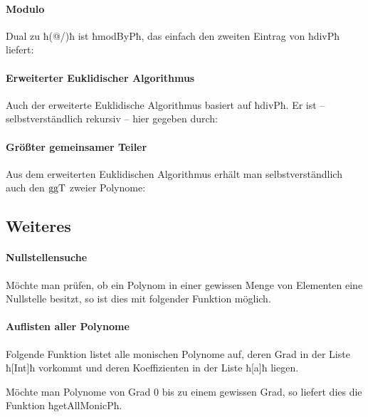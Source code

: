 

\paragraph{Modulo} Dual zu ħ(@/)ħ ist ħmodByPħ, das einfach den zweiten Eintrag
von ħdivPħ liefert:



\paragraph{Erweiterter Euklidischer Algorithmus} Auch der erweiterte
Euklidische Algorithmus basiert auf ħdivPħ. Er ist -- selbstverständlich
rekursiv -- hier gegeben durch:


\paragraph{Größter gemeinsamer Teiler} Aus dem erweiterten Euklidischen
Algorithmus erhält man selbstverständlich auch den $\operatorname{ggT}$ zweier Polynome:


\subsection{Weiteres}

\paragraph{Nullstellensuche} Möchte man prüfen, ob ein Polynom in einer
gewissen Menge von Elementen eine Nullstelle besitzt, so ist dies mit folgender
Funktion möglich.


\paragraph{Auflisten aller Polynome} 
Folgende Funktion listet alle monischen Polynome auf, deren Grad in der Liste
ħ[Int]ħ vorkommt und deren Koeffizienten in der Liste ħ[a]ħ liegen.


Möchte man Polynome von Grad $0$ bis zu einem gewissen Grad, so liefert dies
die Funktion ħgetAllMonicPħ.

